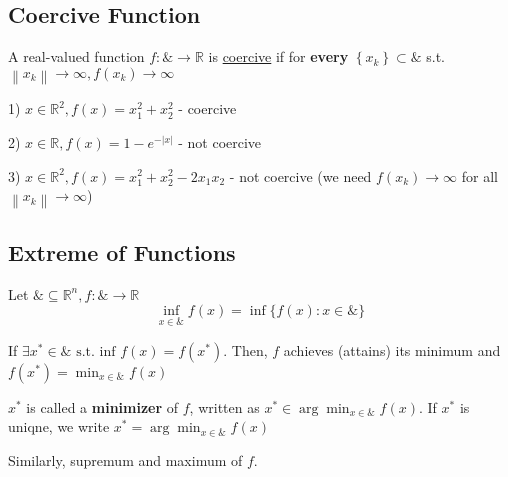 \documentclass[11pt]{elegantbook}
\begin{document}
\subsection{Coercive Function}

\begin{definition}[Coercive]
    A real-valued function $f:\& \rightarrow \mathbb{R}$ is \underline{coercive} if for \textbf{every} $\left\{x_{k}\right\} \subset \&$ s.t. $\left\|x_{k}\right\| \rightarrow \infty, f\left(x_{k}\right) \rightarrow \infty$
\end{definition}

\begin{example}
\end{example}
1) $x \in \mathbb{R}^{2}, f(x)=x_{1}^{2}+x_{2}^{2}$ - coercive

2) $x \in \mathbb{R}, f(x)=1-e^{-|x|}$ - not coercive

3) $x \in \mathbb{R}^{2}, f(x)=x_{1}^{2}+x_{2}^{2}-2 x_{1} x_{2}$ - not coercive
(we need $f(x_k)\rightarrow	\infty$ for all $\left\|x_{k}\right\| \rightarrow \infty$)


\subsection{Extreme of Functions}
\begin{definition}
    Let $\& \subseteq \mathbb{R}^{n}, f: \& \rightarrow \mathbb{R}$
    $$\inf_{x \in \&} f(x)=\inf\{f(x): x \in \&\}$$
\end{definition}

If $\exists x^{*} \in \& \text { s.t. inf } f(x)=f\left(x^{*}\right)$. Then, $f$ achieves (attains) its minimum and $f\left(x^{*}\right)=\min _{x \in \&} f(x)$

$x^{*}$ is called a \textbf{minimizer} of $f$, written as $x^{*} \in \arg \min _{x \in \&} f(x)$. If $x^*$ is uniqne, we write $x^{*}=\arg \min _{x \in \&} f(x)
$

Similarly, supremum and maximum of $f$.
\end{document}
